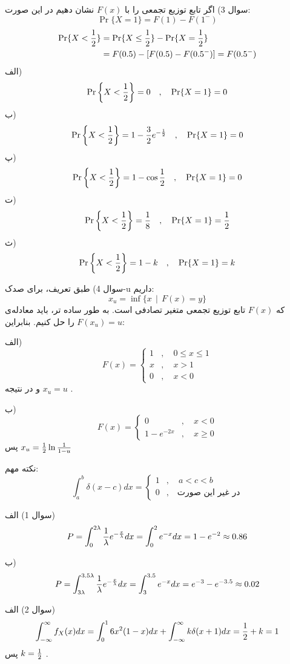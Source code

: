 \documentclass[10pt,letterpaper]{report}
\begin{document}
سوال 3) اگر تابع توزیع تجمعی را با $F(x)$ نشان دهیم در این صورت:
$$
\Pr\{X=1\}=F(1)-F(1^-)
$$
\[
\begin{split}
\Pr\{X<{1\over 2}\}&=\Pr\{X\le{1\over 2}\}-\Pr\{X={1\over 2}\}\\&=F(0.5)-[F(0.5)-F(0.5^-)]=F(0.5^-)
\end{split}
\]
الف)
$$
\Pr\left\{X<{1\over 2}\right\}=0\quad ,\quad \Pr\{X=1\}=0
$$
ب)
$$
\Pr\left\{X<{1\over 2}\right\}=1-{3\over 2}e^{-{1\over 2}}\quad ,\quad \Pr\{X=1\}=0
$$
پ)
$$
\Pr\left\{X<{1\over 2}\right\}=1-\cos{1\over 2}\quad ,\quad \Pr\{X=1\}=0
$$
ت)
$$
\Pr\left\{X<{1\over 2}\right\}={1\over 8}\quad ,\quad \Pr\{X=1\}={1\over 2}
$$
ث)
$$
\Pr\left\{X<{1\over 2}\right\}=1-k\quad ,\quad \Pr\{X=1\}=k
$$

سوال 4) طبق تعریف، برای صدک-u داریم:
$$
x_u=\inf\{x\ \ |\ \ F(x)=y\}
$$
که $F(x)$ تابع توزیع تجمعی متغیر تصادفی است. به طور ساده تر، باید معادله‌ی 
$
F(x_u)=u
$
را حل کنیم. بنابراین:

الف)
$$
F(x)=\begin{cases}
1&,\quad 0\le x\le 1\\
x&,\quad x>1\\
0&,\quad x<0
\end{cases}
$$
و در نتیجه
$
x_u=u
$
.

ب)
$$
F(x)=\begin{cases}
0&,\quad x<0\\
1-e^{-2x}&,\quad x\ge 0
\end{cases}
$$
پس
$
x_u={1\over 2}\ln {1\over 1-u}
$

{\color{red}
نکته مهم:
$$
\int_a^b\delta(x-c)dx=\begin{cases}
1&,\quad a<c<b\\
0&,\quad \text{در غیر این صورت}
\end{cases}
$$
}

سوال 1) الف) 
$$
P=\int_0^{2\lambda}{1\over \lambda}e^{-{x\over\lambda}}dx
=\int_0^{2}e^{-x}dx=1-e^{-2}\approx0.86
$$

ب) 
$$
P=\int_{3\lambda}^{3.5\lambda}{1\over \lambda}e^{-{x\over\lambda}}dx
=\int_3^{3.5}e^{-x}dx=e^{-3}-e^{-3.5}\approx0.02
$$

سوال 2) الف)
$$
\int_{-\infty}^\infty f_X(x)dx=\int_0^16x^2(1-x)dx+\int_{-\infty}^{\infty}k\delta(x+1)dx={1\over2}+k=1
$$
پس
$
k={1\over 2}
$
.
\end{document}
